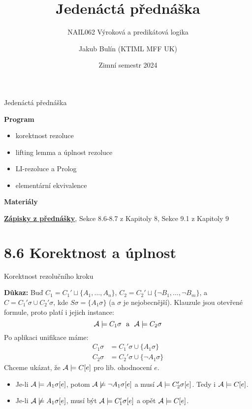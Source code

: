 \documentclass{beamer}
\title{Jedenáctá přednáška}
\subtitle{NAIL062 Výroková a predikátová logika}
\author{Jakub Bulín (KTIML MFF UK)}
\date{Zimní semestr 2024}
\begin{document}
\maketitle


\begin{frame}{Jedenáctá přednáška}

    \textbf{Program}
        \begin{itemize}
            \item korektnost rezoluce
            \item lifting lemma a úplnost rezoluce
            \item LI-rezoluce a Prolog
            \item elementární ekvivalence
        \end{itemize}

    \textbf{Materiály}

        \href{https://github.com/jbulin-mff-uk/nail062/raw/main/lecture/lecture-notes/lecture-notes.pdf}{\alert{\textbf{Zápisky z přednášky}}}, Sekce 8.6-8.7 z Kapitoly 8, Sekce 9.1 z Kapitoly 9

\end{frame}


\section{8.6 Korektnost a úplnost}


\begin{frame}{Korektnost rezolučního kroku}


    \textbf{Důkaz:} Buď $C_1=C_1'\sqcup \{A_1,\dots,A_n\}$, $C_2=C_2'\sqcup \{\neg B_1,\dots,\neg B_m\}$, a $C=C_1'\sigma \cup C_2'\sigma$, kde $S\sigma=\{A_1\sigma\}$ (a $\sigma$ je
    nejobecnější). Klauzule jsou otevřené formule, proto platí i jejich instance:     
    $$
    \A\models C_1\sigma\ \text{ a }\ \A\models C_2\sigma
    $$     
    Po aplikaci unifikace máme: 
    \begin{align*}        
        C_1\sigma&=C_1'\sigma \cup \{A_1\sigma\}\\
        C_2\sigma&=C_2'\sigma \cup \{\neg A_1\sigma\}        
    \end{align*}
    Chceme ukázat, že $\mathcal{A}\models C[e]$ pro lib. ohodnocení $e$. 
    \begin{itemize}
        \item Je-li \alert{$\mathcal{A}\models A_1\sigma[e]$}, potom $\mathcal{A}\not\models\neg A_1\sigma[e]$ a musí \alert{$\mathcal{A}\models C_2'\sigma[e]$}. Tedy i $\mathcal{A}\models C[e]$. 
        \item Je-li \alert{$\mathcal{A}\not\models A_1\sigma[e]$}, musí být \alert{$\mathcal{A}\models C_1'\sigma[e]$} a opět $\mathcal{A}\models C[e]$. \hfill\qedsymbol
    \end{itemize}    

\end{frame}
\end{document}
